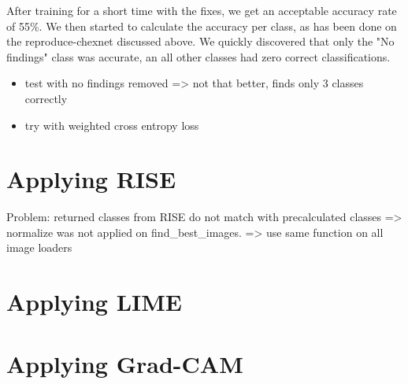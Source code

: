 After training for a short time with the fixes, we get an acceptable accuracy rate of 55\%. We then started to calculate the accuracy per class, as has been done on the reproduce-chexnet discussed above. We quickly discovered that only the "No findings" class was accurate, an all other classes had zero correct classifications.

\begin{itemize}
    \item test with no findings removed => not that better, finds only 3 classes correctly
    \item try with weighted cross entropy loss
\end{itemize}



\section{Applying RISE}
Problem: returned classes from RISE do not match with precalculated classes
=> normalize was not applied on find\_best\_images.
=> use same function on all image loaders

\section{Applying LIME}
\section{Applying Grad-CAM}
